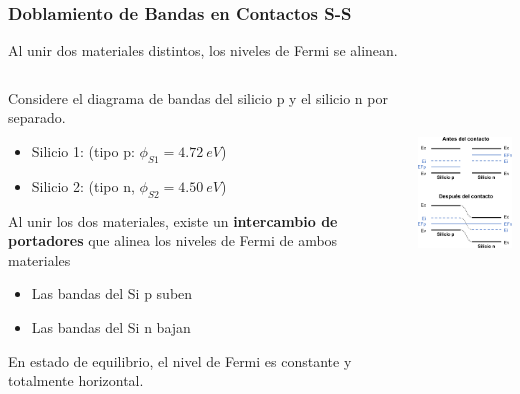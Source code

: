 \documentclass[10pt,t,aspectratio=169]{beamer}
\begin{document}
\begin{frame}[t]
    \frametitle{Doblamiento de Bandas en Contactos S-S}

    \begin{tcolorbox}
        \centering
        Al unir dos materiales distintos, los niveles de Fermi se alinean.
    \end{tcolorbox}

    \begin{columns}
    
        \begin{column}{0.5\textwidth}
        
            Considere el diagrama de bandas del silicio p y el silicio n por separado.

            \begin{itemize}
                \item Silicio 1: (tipo p: $\phi_{S1} = 4.72\ eV$)
                \item Silicio 2: (tipo n, $\phi_{S2} = 4.50\ eV$)
            \end{itemize}

            \vspace{2mm}
            Al unir los dos materiales, existe un \textbf{intercambio de portadores} que alinea los niveles de Fermi de ambos materiales

            \begin{itemize}
                \item Las bandas del Si p suben
                \item Las bandas del Si n bajan
            \end{itemize}
            
            \vspace{2mm}
            En estado de equilibrio, el nivel de Fermi es constante y totalmente horizontal.
            
        \end{column}
        
        \begin{column}{0.5\textwidth}
        
            \centering
            \includegraphics[height=5.5cm]{./figures/contacto-sin-sip.pdf}
            
        \end{column}
        
    \end{columns}

\end{frame}
\end{document}
